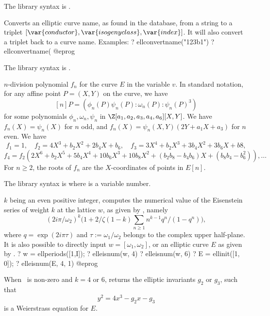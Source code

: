 The library syntax is .

\label{se:ellconvertname}
Converts an elliptic curve name, as found in the  database,
from a string to a triplet $[\var{conductor}, \var{isogeny class},
\var{index}]$. It will also convert a triplet back to a curve name.
Examples:
\bprog
? ellconvertname("123b1")
? ellconvertname(%
@eprog

The library syntax is .

\label{se:elldivpol}
$n$-division polynomial $f_n$ for the curve $E$ in the
variable $v$. In standard notation, for any affine point $P = (X,Y)$ on the
curve, we have
$$[n]P = (\phi_n(P)\psi_n(P) : \omega_n(P) : \psi_n(P)^3)$$
for some polynomials $\phi_n,\omega_n,\psi_n$ in
$\Z[a_1,a_2,a_3,a_4,a_6][X,Y]$. We have $f_n(X) = \psi_n(X)$ for $n$ odd, and
$f_n(X) = \psi_n(X,Y) (2Y + a_1X+a_3)$ for $n$ even. We have
$$ f_1  = 1,\quad f_2 = 4X^3 + b_2X^2 + 2b_4 X + b_6, \quad f_3 = 3 X^4 + b_2 X^3 + 3b_4 X^2 + 3 b_6 X + b8, $$
$$ f_4 = f_2(2X^6 + b_2 X^5 + 5b_4 X^4 + 10 b_6 X^3 + 10 b_8 X^2 +
(b_2b_8-b_4b_6)X + (b_8b_4 - b_6^2)), \dots $$
For $n \geq 2$, the roots of $f_n$ are the $X$-coordinates of points in $E[n]$.

The library syntax is  where  is a variable number.

\label{se:elleisnum}
$k$ being an even positive integer, computes the numerical value of the
Eisenstein series of weight $k$ at the lattice $w$, as given by
, namely
$$
(2i \pi/\omega_2)^k
\Big(1 + 2/\zeta(1-k) \sum_{n\geq 1} n^{k-1}q^n / (1-q^n)\Big),
$$
where $q = \exp(2i\pi \tau)$ and $\tau:=\omega_1/\omega_2$ belongs to the
complex upper half-plane. It is also possible to directly input $w =
[\omega_1,\omega_2]$, or an elliptic curve $E$ as given by .
\bprog
? w = ellperiods([1,I]);
? elleisnum(w, 4)
? elleisnum(w, 6)
? E = ellinit([1, 0]);
? elleisnum(E, 4, 1)
@eprog

When \fl\ is non-zero and $k=4$ or 6, returns the elliptic invariants $g_2$
or $g_3$, such that
$$y^2 = 4x^3 - g_2 x - g_3$$
is a Weierstrass equation for $E$.


